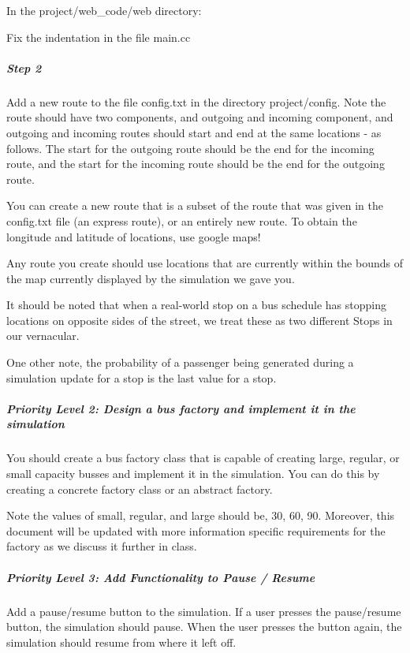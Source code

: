 In the {\ttfamily project/web\+\_\+code/web} directory\+:


\begin{DoxyEnumerate}
\item Fix the indentation in the file {\ttfamily main.\+cc}
\end{DoxyEnumerate}

\subparagraph*{Step 2}

Add a new route to the file {\ttfamily config.\+txt} in the directory {\ttfamily project/config}. Note the route should have two components, and outgoing and incoming component, and outgoing and incoming routes should start and end at the same locations -\/ as follows. The start for the outgoing route should be the end for the incoming route, and the start for the incoming route should be the end for the outgoing route.

You can create a new route that is a subset of the route that was given in the {\ttfamily config.\+txt} file (an express route), or an entirely new route. To obtain the longitude and latitude of locations, use google maps!

Any route you create should use locations that are currently within the bounds of the map currently displayed by the simulation we gave you.

It should be noted that when a real-\/world stop on a bus schedule has stopping locations on opposite sides of the street, we treat these as two different Stops in our vernacular.

One other note, the probability of a passenger being generated during a simulation update for a stop is the last value for a stop.

\subparagraph*{Priority Level 2\+: Design a bus factory and implement it in the simulation}

You should create a bus factory class that is capable of creating large, regular, or small capacity busses and implement it in the simulation. You can do this by creating a concrete factory class or an abstract factory.

Note the values of small, regular, and large should be, 30, 60, 90. Moreover, this document will be updated with more information specific requirements for the factory as we discuss it further in class.

\subparagraph*{Priority Level 3\+: Add Functionality to Pause / Resume}

Add a pause/resume button to the simulation. If a user presses the pause/resume button, the simulation should pause. When the user presses the button again, the simulation should resume from where it left off.


